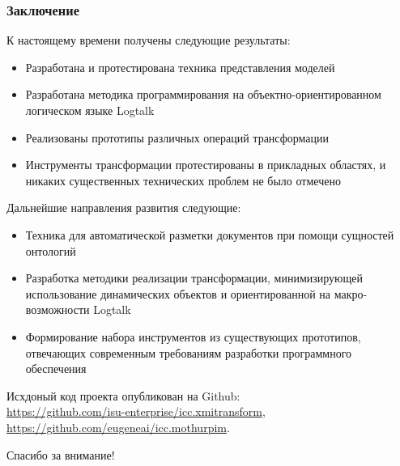 \documentclass[10pt]{beamer}
\begin{document}
\begin{frame}
  \frametitle{Заключение}
  К настоящему времени получены следующие результаты:
  \begin{itemize}
  \item Разработана и протестирована техника представления моделей
  \item Разработана методика программирования на объектно-ориентированном логическом языке Logtalk
  \item Реализованы прототипы различных операций трансформации
  \item Инструменты трансформации протестированы в прикладных областях, и никаких существенных технических проблем не было отмечено
  \end{itemize}
  Дальнейшие направления развития следующие:
  \begin{itemize}
  \item Техника для автоматической разметки документов при помощи сущностей онтологий
  \item Разработка методики реализации трансформации, минимизирующей использование динамических объектов и ориентированной на макро-возможности Logtalk
  \item Формирование набора инструментов из существующих прототипов, отвечающих современным требованиям разработки программного обеспечения
  \end{itemize}
  Исхдоный код проекта опубликован на Github:\\
\url{https://github.com/isu-enterprise/icc.xmitransform},\\ \url{https://github.com/eugeneai/icc.mothurpim}.
\end{frame}



\begin{frame}
  \begin{center}
    \Large Спасибо за внимание!
\end{center}
\end{frame}
\end{document}
